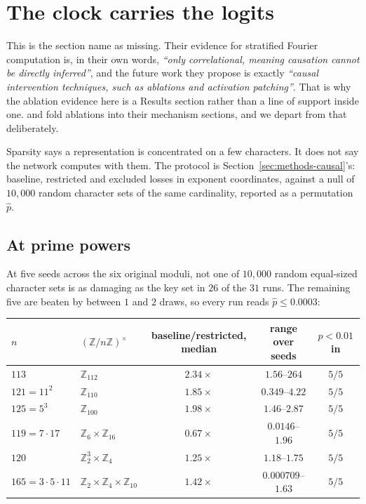 \section{The clock carries the logits}
\label{sec:causal}

This is the section \citet{chen2026multiplication} name as missing. Their evidence for
stratified Fourier computation is, in their own words, \emph{``only correlational, meaning
causation cannot be directly inferred''}, and the future work they propose is exactly
\emph{``causal intervention techniques, such as ablations and activation patching''}. That is
why the ablation evidence here is a Results section rather than a line of support inside one.
\citet{nanda2023progress} and \citet{chughtai2023toy} fold ablations into their mechanism
sections, and we depart from that deliberately.

Sparsity says a representation is concentrated on a few characters. It does not say the
network computes with them. The protocol is Section~\ref{sec:methods-causal}'s: baseline, restricted
and excluded losses in exponent coordinates, against a null of $10{,}000$ random character
sets of the same cardinality, reported as a permutation $\hat{p}$.

\subsection{At prime powers}
\label{sec:causal-primepowers}

At five seeds across the six original moduli, not one of $10{,}000$ random equal-sized
character sets is as damaging as the key set in $26$ of the $31$ runs. The remaining five are
beaten by between $1$ and $2$ draws, so every run reads $\hat{p} \le 0.0003$:

\begin{center}
\begin{tabular}{llccc}
  \toprule
  $n$ & $(\mathbb{Z}/n\mathbb{Z})^{\times}$ & baseline/restricted, median & range over seeds & $p < 0.01$ in \\
  \midrule
  $113$ & $\mathbb{Z}_{112}$ & $2.34\times$ & $1.56$--$264$ & $5/5$ \\
  $121 = 11^{2}$ & $\mathbb{Z}_{110}$ & $1.85\times$ & $0.349$--$4.22$ & $5/5$ \\
  $125 = 5^{3}$ & $\mathbb{Z}_{100}$ & $1.98\times$ & $1.46$--$2.87$ & $5/5$ \\
  $119 = 7 \cdot 17$ & $\mathbb{Z}_{6} \times \mathbb{Z}_{16}$ & $0.67\times$ & $0.0146$--$1.96$ & $5/5$ \\
  $120$ & $\mathbb{Z}_{2}^{3} \times \mathbb{Z}_{4}$ & $1.25\times$ & $1.18$--$1.75$ & $5/5$ \\
  $165 = 3 \cdot 5 \cdot 11$ & $\mathbb{Z}_{2} \times \mathbb{Z}_{4} \times \mathbb{Z}_{10}$ & $1.42\times$ & $0.000709$--$1.63$ & $5/5$ \\
  \bottomrule
\end{tabular}
\end{center}

